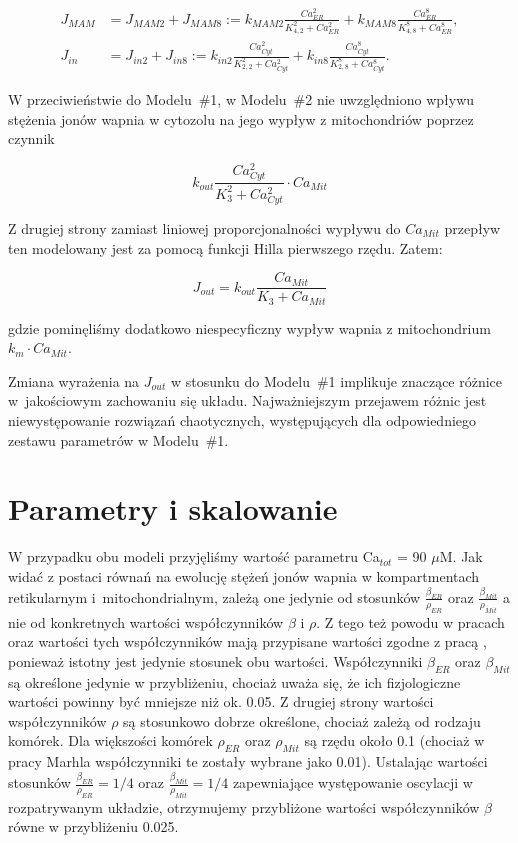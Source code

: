 \begin{align}
	J_{MAM} &= J_{MAM2} + J_{MAM8} := k_{MAM2} \frac{Ca_{ER}^2}{K_{4,2}^2 + Ca_{ER}^2}%
	+ k_{MAM8} \frac{Ca_{ER}^8}{K_{4,8}^8 + Ca_{ER}^8},\label{eq:jmamMo2}\\
J_{in} &= J_{in2} + J_{in8}:=k_{in2}\frac{Ca_{Cyt}^2}{K_{2,2}^2+Ca_{Cyt}^2} 
				+ k_{in8}\frac{Ca_{Cyt}^8}{K_{2,8}^8+Ca_{Cyt}^8}.\label{eq:jinMo2}
\end{align}

W przeciwieństwie do Modelu~\#1, w Modelu~\#2 nie uwzględniono wpływu stężenia jonów wapnia w cytozolu na jego wypływ z mitochondriów poprzez czynnik 

\[k_{out}\frac{Ca_{Cyt}^2}{K_3^2+Ca_{Cyt}^2}\cdot Ca_{Mit}\]

Z drugiej strony zamiast liniowej proporcjonalności wypływu do $Ca_{Mit}$ przepływ ten modelowany jest za pomocą funkcji Hilla pierwszego rzędu. Zatem:

\begin{equation}
J_{out} = k_{out}\frac{Ca_{Mit}}{K_3+Ca_{Mit}} \label{eq:joutMo2}
\end{equation}

\noindent gdzie pominęliśmy dodatkowo niespecyficzny wypływ wapnia z mitochondrium \\$k_{m}\cdot Ca_{Mit}$.

Zmiana wyrażenia na $J_{out}$ w stosunku do Modelu~\#1 implikuje znaczące różnice w~jakościowym zachowaniu się układu. Najważniejszym przejawem różnic jest niewystępowanie rozwiązań chaotycznych, występujących dla odpowiedniego zestawu parametrów w Modelu~\#1.

\FloatBarrier
\section{Parametry i skalowanie}\label{sec:parametry}

W przypadku obu modeli przyjęliśmy wartość parametru Ca$_{tot}$ = 90 $\mu$M. Jak widać z postaci równań na ewolucję stężeń jonów wapnia w kompartmentach retikularnym i~mitochondrialnym, zależą one jedynie od stosunków $\frac{\beta_{ER}}{\rho_{ER}}$ oraz $\frac{\beta_{Mit}}{\rho_{Mit}}$ a nie od konkretnych wartości współczynników $\beta$ i $\rho$. Z tego też powodu w pracach \cite{Dyzma2012} oraz \cite{Szopa2013} wartości tych współczynników mają przypisane wartości zgodne z pracą \cite{Marhl2000}, ponieważ istotny jest jedynie stosunek obu wartości. Współczynniki $\beta_{ER}$ oraz $\beta_{Mit}$ są określone jedynie w przybliżeniu, chociaż uważa się, że ich fizjologiczne wartości powinny być mniejsze niż ok. 0.05. Z drugiej strony wartości współczynników $\rho$ są stosunkowo dobrze określone, chociaż zależą od rodzaju komórek. Dla większości komórek $\rho_{ER}$ oraz $\rho_{Mit}$ są rzędu około 0.1 (chociaż w pracy Marhla \cite{Marhl2000} współczynniki te zostały wybrane jako 0.01). Ustalając wartości stosunków $\frac{\beta_{ER}}{\rho_{ER}}=1/4$ oraz $\frac{\beta_{Mit}}{\rho_{Mit}}=1/4$ zapewniające występowanie oscylacji w rozpatrywanym układzie, otrzymujemy przybliżone wartości współczynników $\beta$ równe w przybliżeniu 0.025. 

